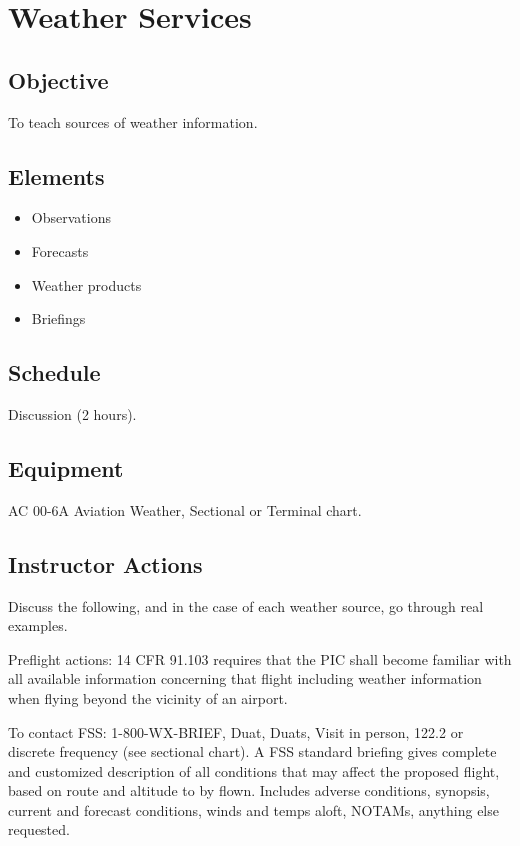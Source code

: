 \section{Weather Services}

\subsection{Objective}

To teach sources of weather information.

\subsection{Elements}

\begin{itemize}
  \item Observations
  \item Forecasts
  \item Weather products
  \item Briefings
\end{itemize}

\subsection{Schedule}

Discussion (2 hours).

\subsection{Equipment}

AC 00-6A Aviation Weather, Sectional or Terminal chart.

\subsection{Instructor Actions}

Discuss the following, and in the case of each weather source, go through real examples.

Preflight actions: 14 CFR 91.103 requires that the PIC shall become familiar
with all available information concerning that flight including weather
information when flying beyond the vicinity of an airport.

To contact FSS: 1-800-WX-BRIEF, Duat, Duats, Visit in person, 122.2 or discrete
frequency (see sectional chart). A FSS standard briefing gives complete and
customized description of all conditions that may affect the proposed flight,
based on route and altitude to by flown. Includes adverse conditions, synopsis,
current and forecast conditions, winds and temps aloft, NOTAMs, anything else
requested.

